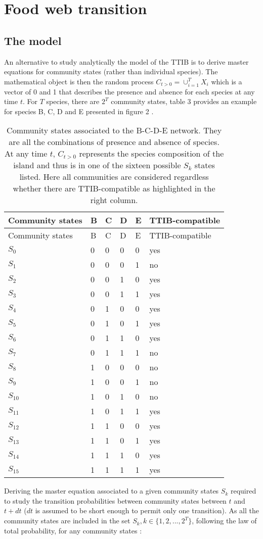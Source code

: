 \section{Food web transition}\label{food-web-transition}

\subsection{The model}\label{the-model}

An alternative to study analytically the model of the TTIB is to derive
master equations for community states (rather than individual species).
The mathematical object is then the random process
\(C_{t>0}=\cup_{i=1}^TX_i\) which is a vector of 0 and 1 that describes
the presence and absence for each species at any time \(t\). For \(T\)
species, there are \(2^T\) community states, table 3 provides an example
for species B, C, D and E presented in figure 2 .

\begin{longtable}[]{@{}llllll@{}}
\caption{Community states associated to the B-C-D-E network. They are
all the combinations of presence and absence of species. At any time
\(t\), \(C_{t>0}\) represents the species composition of the island and
thus is in one of the sixteen possible \(S_k\) states listed. Here all
communities are considered regardless whether there are TTIB-compatible
as highlighted in the right column.}\tabularnewline
\toprule
Community states & B & C & D & E & TTIB-compatible\tabularnewline
\midrule
\endfirsthead
\toprule
Community states & B & C & D & E & TTIB-compatible\tabularnewline
\midrule
\endhead
\(S_{0}\) & 0 & 0 & 0 & 0 & yes\tabularnewline
\(S_{1}\) & 0 & 0 & 0 & 1 & no\tabularnewline
\(S_{2}\) & 0 & 0 & 1 & 0 & yes\tabularnewline
\(S_{3}\) & 0 & 0 & 1 & 1 & yes\tabularnewline
\(S_{4}\) & 0 & 1 & 0 & 0 & yes\tabularnewline
\(S_{5}\) & 0 & 1 & 0 & 1 & yes\tabularnewline
\(S_{6}\) & 0 & 1 & 1 & 0 & yes\tabularnewline
\(S_{7}\) & 0 & 1 & 1 & 1 & no\tabularnewline
\(S_{8}\) & 1 & 0 & 0 & 0 & no\tabularnewline
\(S_{9}\) & 1 & 0 & 0 & 1 & no\tabularnewline
\(S_{10}\) & 1 & 0 & 1 & 0 & no\tabularnewline
\(S_{11}\) & 1 & 0 & 1 & 1 & yes\tabularnewline
\(S_{12}\) & 1 & 1 & 0 & 0 & yes\tabularnewline
\(S_{13}\) & 1 & 1 & 0 & 1 & yes\tabularnewline
\(S_{14}\) & 1 & 1 & 1 & 0 & yes\tabularnewline
\(S_{15}\) & 1 & 1 & 1 & 1 & yes\tabularnewline
\bottomrule
\end{longtable}

Deriving the master equation associated to a given community states
\(S_k\) required to study the transition probabilities between community
states between \(t\) and \(t+dt\) (\(dt\) is assumed to be short enough
to permit only one transition). As all the community states are included
in the set \(S_k, k\in\{1,2,...,2^T\}\), following the law of total
probability, for any community states :


